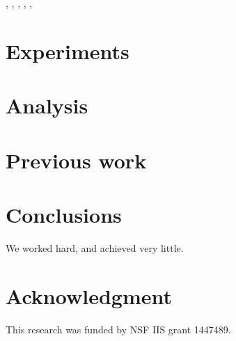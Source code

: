 \documentclass[10pt]{proc}
\begin{document}
\cite{gaffney_trajectory_1999},
\cite{gorur_dirichlet_2010},
\cite{kamper_gibbs_2013},
\cite{kottas_nonparametric_2005},
\cite{neal_markov_2000},
\cite{rasmussen_infinite_1999}

\section{Experiments}\label{experiments}

\section{Analysis}\label{analysis}

\section{Previous work}\label{previous work}

\section{Conclusions}\label{conclusions}
We worked hard, and achieved very little.

\section*{Acknowledgment}
This research was funded by NSF IIS grant 1447489.




\end{document}

